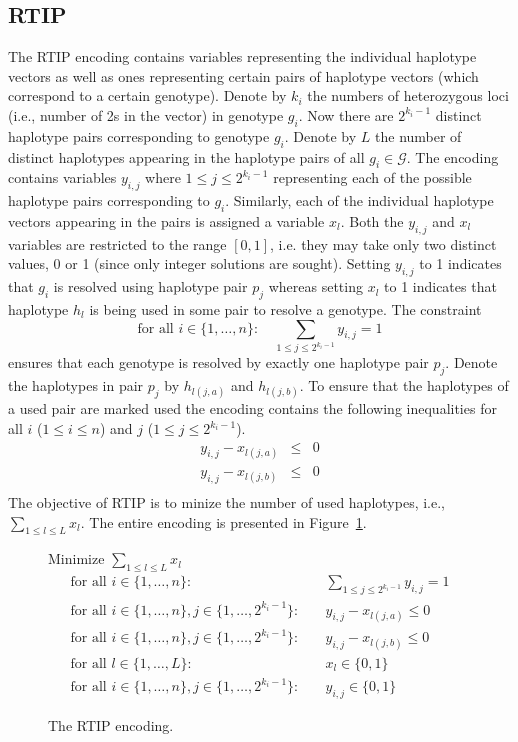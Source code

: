 \documentclass[12pt,a4paper]{article}
\begin{document}
\subsection{RTIP}

The RTIP encoding contains variables representing the individual haplotype vectors as well as ones representing certain pairs of haplotype vectors (which correspond to a certain genotype).
Denote by $k_i$ the numbers of heterozygous loci (i.e., number of 2s in the vector) in genotype $g_i$.
Now there are $2^{k_i-1}$ distinct haplotype pairs corresponding to genotype $g_i$.
Denote by $L$ the number of distinct haplotypes appearing in the haplotype pairs of all $g_i\in\mathcal{G}$.
The encoding contains variables $y_{i,j}$ where $1\leq j \leq 2^{k_i-1}$ representing each of the possible haplotype pairs corresponding to $g_i$.
Similarly, each of the individual haplotype vectors appearing in the pairs is assigned a variable $x_l$.
Both the $y_{i,j}$ and $x_l$ variables are restricted to the range $[0,1]$, i.e. they may take only two distinct values, 0 or 1 (since only integer solutions are sought).
Setting $y_{i,j}$ to 1 indicates that $g_i$ is resolved using haplotype pair $p_j$ whereas 
setting $x_l$ to 1 indicates that haplotype $h_l$ is being used in some pair to resolve a genotype.
The constraint
$$ \text{for all  }i\in\{1,\dots , n\}:\quad \sum_{1\leq j \leq 2^{k_i-1}} y_{i,j} = 1 $$
ensures that each genotype is resolved by exactly one haplotype pair $p_j$.
Denote the haplotypes in pair $p_j$ by $h_{l(j,a)}$ and $h_{l(j,b)}$.
To ensure that the haplotypes of a used pair are marked used the encoding contains the following inequalities for all $i$ ($1\leq i \leq n$) and $j$ ($1\leq j \leq 2^{k_i-1}$).
\begin{eqnarray*}
y_{i,j} - x_{l(j,a)} & \leq & 0 \\
y_{i,j} - x_{l(j,b)} & \leq & 0 \\
\end{eqnarray*}
The objective of RTIP is to minize the number of used haplotypes, i.e., $\sum_{1\leq l \leq L} x_l$.
The entire encoding is presented in Figure~\ref{fig:enc-rtip}.

\begin{figure}
\begin{mdframed}
\centering
Minimize $\sum_{1\leq l \leq L} x_l$
\begin{align}
\text{for all  }i\in\{1,\dots , n\}:&\quad \sum_{1\leq j \leq 2^{k_i-1}} y_{i,j} = 1 \\
\text{for all  }i\in\{1,\dots , n\}, j\in\{1,\dots , 2^{k_i-1}\}:& \quad y_{i,j} - x_{l(j,a)}  \leq  0 \\
\text{for all  }i\in\{1,\dots , n\}, j\in\{1,\dots , 2^{k_i-1}\}:&\quad y_{i,j} - x_{l(j,b)}  \leq  0 \\
\text{for all  }l\in\{1,\dots , L\}:&\quad x_l \in \{0,1\} \\
\text{for all  }i\in\{1,\dots , n\}, j\in\{1,\dots , 2^{k_i-1}\}:&\quad y_{i,j} \in \{0,1\} 
\end{align}
\end{mdframed}
\caption{The RTIP encoding.}
\label{fig:enc-rtip}
\end{figure}
\end{document}
